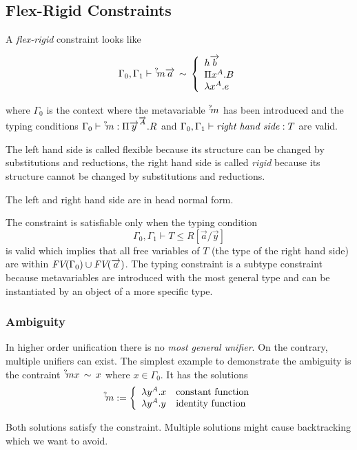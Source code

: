 \subsection{Flex-Rigid Constraints}

A \emph{flex-rigid} constraint looks like

$$
%
    \Gamma_0, \Gamma_1
%
    \vdash
%
    \meta m \vec a
%
    \equiv
%
    \cases {
        h \vec b
        \\
        \Pi x^A. B
        \\
        \lambda x^A. e
    }
$$

where $\Gamma_0$ is the context where the metavariable ${{}^? \kern-0.2em m}$ has been
introduced and the typing conditions
$\Gamma_0 \vdash {{}^? \kern-0.2em m} : \Pi {\overrightarrow {y}}^{{\overrightarrow {A}}}. R$
and
$\Gamma_0, \Gamma_1 \vdash \text{\emph{right hand side}}: T$
are valid.

The left hand side is called flexible because its structure can be changed by
substitutions and reductions, the right hand side is called \emph{rigid} because
its structure cannot be changed by substitutions and reductions.

The left and right hand side are in head normal form.


The constraint is satisfiable only when the typing condition
$$
    \Gamma_0, \Gamma_1 \vdash T \le R[\vec a / \vec y]
$$
is valid which implies that all free variables of $T$ (the type of the right
hand side) are within ${\text{\it FV}}(\Gamma_0) \cup {\text{\it FV}}({\overrightarrow {a}})$. The typing constraint is a
subtype constraint because metavariables are introduced with the most general
type and can be instantiated by an object of a more specific type.



\subsubsection{Ambiguity}
In higher order unification there is no \emph{most general unifier}. On the
contrary, multiple unifiers can exist. The simplest example to demonstrate the
ambiguity is the contraint ${{}^? \kern-0.2em m} x \,\sim\, x$ where $x \in \Gamma_0$. It has
the solutions
$$
    {{}^? \kern-0.2em m} := \left\{ \begin{array}{lllll} 
        \lambda y^A. x & \text{constant function}
        \\
        \lambda y^A. y & \text{identity function}
     \end{array} \right.
$$

Both solutions satisfy the constraint. Multiple solutions might cause
backtracking which we want to avoid.




